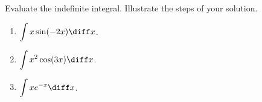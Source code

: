 Evaluate the indefinite integral. Illustrate the steps of your solution.
\begin{multicols}{2}
\begin{enumerate}[ref={\fcProblemRef}]
\item $\displaystyle \int x\sin (-2x)\diff x$.
\item $\displaystyle \int x^2\cos (3x)\diff x$.
\item $\displaystyle \int x e^{-x}\diff x$.
\end{enumerate}
\end{multicols}
